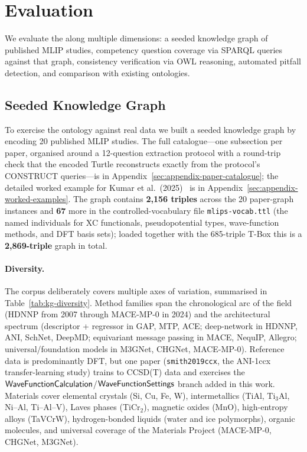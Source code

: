 \section{Evaluation}
\label{sec:evaluation}

We evaluate the \MLIPsOntology{} along multiple dimensions: a seeded
knowledge graph of published MLIP studies, competency question coverage
via SPARQL queries against that graph, consistency verification via
OWL reasoning, automated pitfall detection, and comparison with
existing ontologies.

\subsection{Seeded Knowledge Graph}
\label{sec:eval-kg}

To exercise the ontology against real data we built a seeded knowledge
graph by encoding 20 published MLIP studies. The full catalogue---one
subsection per paper, organised around a 12-question extraction
protocol with a round-trip check that the encoded Turtle reconstructs
exactly from the protocol's CONSTRUCT
queries---is in Appendix~\ref{sec:appendix-paper-catalogue}; the
detailed worked example for Kumar et al.\ (2025)~\cite{kumar2025ticr2h}
is in Appendix~\ref{sec:appendix-worked-examples}. The graph contains
\textbf{2{,}156 triples} across the 20 paper-graph instances and
\textbf{67} more in the controlled-vocabulary file
\texttt{mlips-vocab.ttl} (the named individuals for XC functionals,
pseudopotential types, wave-function methods, and DFT basis sets);
loaded together with the 685-triple T-Box this is a
\textbf{2{,}869-triple} graph in total.

\paragraph{Diversity.}
The corpus deliberately covers multiple axes of variation, summarised
in Table~\ref{tab:kg-diversity}. Method families span the chronological
arc of the field (HDNNP from 2007 through MACE-MP-0 in 2024) and the
architectural spectrum (descriptor + regressor in GAP, MTP, ACE;
deep-network in HDNNP, ANI, SchNet, DeepMD; equivariant message passing
in MACE, NequIP, Allegro; universal/foundation models in M3GNet,
CHGNet, MACE-MP-0). Reference data is predominantly DFT, but one paper
(\texttt{smith2019ccx}, the ANI-1ccx transfer-learning study) trains
to CCSD(T) data and exercises the
$\mathsf{WaveFunctionCalculation}$/$\mathsf{WaveFunctionSettings}$ branch added in
this work. Materials cover elemental crystals (Si, Cu, Fe, W),
intermetallics (TiAl, Ti$_3$Al, Ni--Al, Ti--Al--V), Laves phases
(TiCr$_2$), magnetic oxides (MnO), high-entropy alloys (TaVCrW),
hydrogen-bonded liquids (water and ice polymorphs), organic molecules,
and universal coverage of the Materials Project (MACE-MP-0, CHGNet,
M3GNet).

